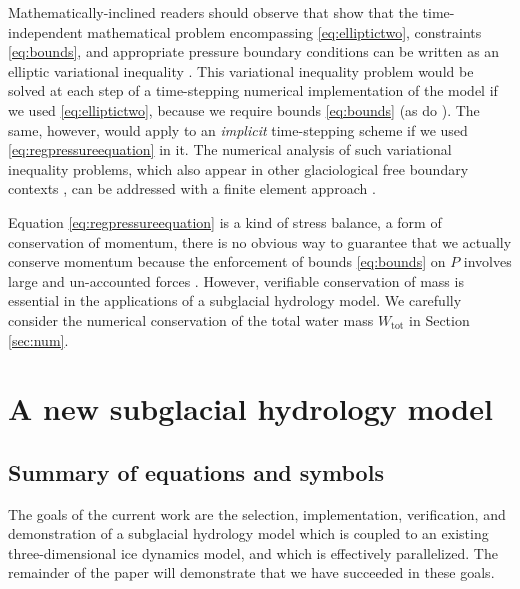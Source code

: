 \documentclass[11pt,final]{amsart}
\newcommand{\Wtot}{W_{\text{tot}}}
\begin{document}
Mathematically-inclined readers should observe that \cite{Schoofetal2012} show that the time-independent mathematical problem encompassing \eqref{eq:elliptictwo}, constraints \eqref{eq:bounds}, and appropriate pressure boundary conditions can be written as an elliptic variational inequality \citep{KinderlehrerStampacchia}.  This variational inequality problem would be solved at each step of a time-stepping numerical implementation of the model if we used \eqref{eq:elliptictwo}, because we require bounds \eqref{eq:bounds} (as do \citep{Schoofetal2012}).  The same, however, would apply to an \emph{implicit} time-stepping scheme if we used \eqref{eq:regpressureequation} in it.  The numerical analysis of such variational inequality problems, which also appear in other glaciological free boundary contexts \citep{SchoofStream,JouvetBueler2012}, can be addressed with a finite element approach \citep{Ciarlet}.

Equation \eqref{eq:regpressureequation} is a kind of stress balance, a form of conservation of momentum, there is no obvious way to guarantee that we actually conserve momentum because the enforcement of bounds \eqref{eq:bounds} on $P$ involves large and un-accounted forces \citep{Schoofetal2012}.  However, verifiable conservation of mass is essential in the applications of a subglacial hydrology model.  We carefully consider the numerical conservation of the total water mass $\Wtot$ in Section \ref{sec:num}.



\section{A new subglacial hydrology model} \label{sec:newmodel}

\subsection*{Summary of equations and symbols}  The goals of the current work are the selection, implementation, verification, and demonstration of a subglacial hydrology model which is coupled to an existing three-dimensional ice dynamics model, and which is effectively parallelized.  The remainder of the paper will demonstrate that we have succeeded in these goals.
\end{document}
